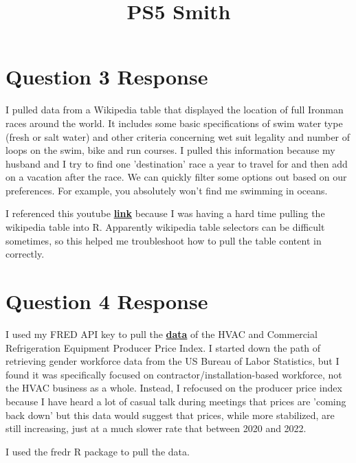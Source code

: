 \documentclass{article}
\title{PS5 Smith}
\begin{document}
\maketitle

\section{Question 3 Response}
I pulled data from a Wikipedia table that displayed the location of full Ironman races around the world. It includes some basic specifications of swim water type (fresh or salt water) and other criteria concerning wet suit legality and number of loops on the swim, bike and run courses. I pulled this information because my husband and I try to find one 'destination' race a year to travel for and then add on a vacation after the race. We can quickly filter some options out based on our preferences. For example, you absolutely won't find me swimming in oceans.

I referenced this youtube \textbf{\href{https://www.youtube.com/watch?v=WeuAiqWlcu0}{link}} because I was having a hard time pulling the wikipedia table into R. Apparently wikipedia table selectors can be difficult sometimes, so this helped me troubleshoot how to pull the table content in correctly.
\space

\section{Question 4 Response}
I used my FRED API key to pull the \textbf{\href{https://fred.stlouisfed.org/series/PCU3334133341}{data}} of the HVAC and Commercial Refrigeration Equipment Producer Price Index. I started down the path of retrieving gender workforce data from the US Bureau of Labor Statistics, but I found it was specifically focused on contractor/installation-based workforce, not the HVAC business as a whole. Instead, I refocused on the producer price index because I have heard a lot of casual talk during meetings that prices are 'coming back down' but this data would suggest that prices, while more stabilized, are still increasing, just at a much slower rate that between 2020 and 2022.

I used the fredr R package to pull the data.
\space
\end{document}
